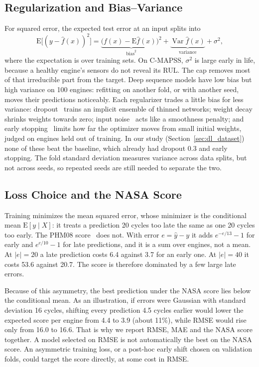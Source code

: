 \subsection{Regularization and Bias--Variance}
For squared error, the expected test error at an input splits
into~\cite{Geman1992neural}
\begin{equation}
\mathrm{E}\bigl[(y-\hat f(x))^2\bigr]
=\underbrace{\bigl(f(x)-\mathrm{E}\hat f(x)\bigr)^2}_{\text{bias}^2}
+\underbrace{\operatorname{Var}\hat f(x)}_{\text{variance}}
+\sigma^2 ,
\end{equation}
where the expectation is over training sets. On C-MAPSS, $\sigma^2$ is large
early in life, because a healthy engine's sensors do not reveal its RUL. The
cap removes most of that irreducible part from the target. Deep sequence
models have low bias but high variance on 100 engines: refitting on another
fold, or with another seed, moves their predictions noticeably. Each
regularizer trades a little bias for less variance:
dropout~\cite{Srivastava2014dropout} trains an implicit ensemble of thinned
networks; weight decay shrinks weights towards zero; input
noise~\cite{Bishop1995noise} acts like a smoothness penalty; and early
stopping~\cite{Prechelt1998early} limits how far the optimizer moves from
small initial weights, judged on engines held out of training. In our study
(Section~\ref{sec:dl_dataset}) none of these beat the baseline, which already
had dropout 0.3 and early stopping. The fold standard deviation measures
variance across data splits, but not across seeds, so repeated seeds are
still needed to separate the two.

\subsection{Loss Choice and the NASA Score}
Training minimizes the mean squared error, whose minimizer is the
conditional mean $\mathrm{E}[y\mid X]$: it treats a prediction 20 cycles too
late the same as one 20 cycles too early. The PHM08
score~\cite{Saxena2008damage} does not. With error $e=\hat y-y$ it adds
$e^{-e/13}-1$ for early and $e^{e/10}-1$ for late predictions, and it is a
sum over engines, not a mean. At $|e|=20$ a late prediction costs 6.4 against
3.7 for an early one. At $|e|=40$ it costs 53.6 against 20.7. The score is
therefore dominated by a few large late errors.

Because of this asymmetry, the best prediction under the NASA score lies
below the conditional mean. As an illustration, if errors were Gaussian
with standard deviation 16 cycles, shifting every prediction 4.5 cycles
earlier would lower the expected score per engine from 4.4 to 3.9 (about
11\%), while RMSE would rise only from 16.0 to 16.6. That is why we report
RMSE, MAE and the NASA score together. A model selected on RMSE is not
automatically the best on the NASA score. An asymmetric training loss, or a
post-hoc early shift chosen on validation folds, could target the score
directly, at some cost in RMSE.
